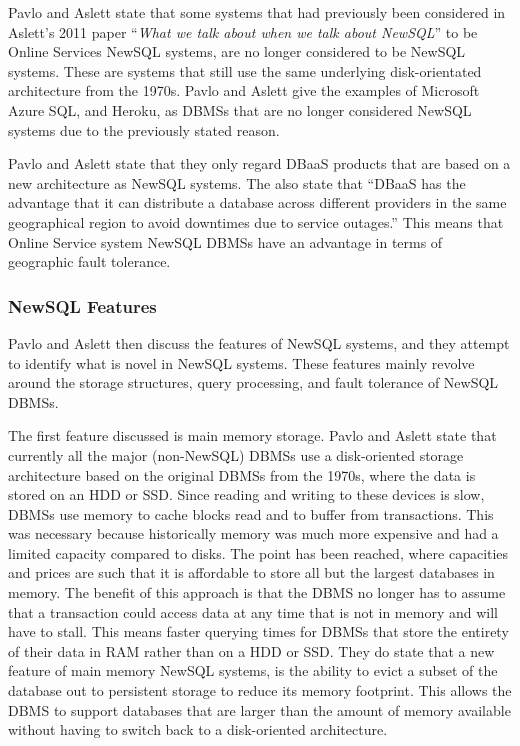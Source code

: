 \documentclass[10pt, conference]{IEEEtran}
\begin{document}
Pavlo and Aslett state that some systems that had previously been considered in Aslett's 2011 paper ``\textit{What we talk about when we talk about NewSQL}'' \cite{aslett} to be Online Services NewSQL systems, are no longer considered to be NewSQL systems. These are systems that still use the same underlying disk-orientated architecture from the 1970s. Pavlo and Aslett give the examples of Microsoft Azure SQL, and Heroku, as DBMSs that are no longer considered NewSQL systems due to the previously stated reason. 

Pavlo and Aslett state that they only regard DBaaS products that are based on a new architecture as NewSQL systems. The also state that ``DBaaS has the advantage that it can distribute a database across different providers in the same geographical region to avoid downtimes due to service outages.'' This means that Online Service system NewSQL DBMSs have an advantage in terms of geographic fault tolerance.

\subsubsection{NewSQL Features}

Pavlo and Aslett then discuss the features of NewSQL systems, and they attempt to identify what is novel in NewSQL systems. These features mainly revolve around the storage structures, query processing, and fault tolerance of NewSQL DBMSs.

The first feature discussed is main memory storage. Pavlo and Aslett state that currently all the major (non-NewSQL) DBMSs use a disk-oriented storage architecture based on the original DBMSs from the 1970s, where the data is stored on an HDD or SSD. Since reading and writing to these devices is slow, DBMSs use memory to cache blocks read and to buffer from transactions. This was necessary because historically memory was much more expensive and had a limited capacity compared to disks. The point has been reached, where capacities and prices are such that it is affordable to store all but the largest databases in memory. The benefit of this approach is that the DBMS no longer has to assume that a transaction could access data at any time that is not in memory and will have to stall. This means faster querying times for DBMSs that store the entirety of their data in RAM rather than on a HDD or SSD. They do state that a new feature of main memory NewSQL systems, is the ability to evict a subset of the database out to persistent storage to reduce its memory footprint. This allows the DBMS to support databases that are larger than the amount of memory available without having to switch back to a disk-oriented architecture. 
\end{document}
